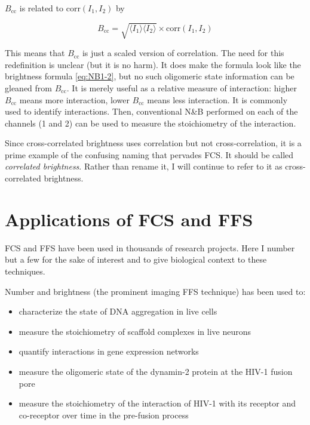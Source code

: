 \documentclass[12pt,]{book}
\providecommand{\tightlist}{%
  \setlength{\itemsep}{0pt}\setlength{\parskip}{0pt}}
\theoremstyle{definition}
\theoremstyle{definition}
\theoremstyle{definition}
\theoremstyle{remark}
\let\BeginKnitrBlock\begin \let\EndKnitrBlock\end
\begin{document}
\(B_\text{cc}\) is related to \(\text{corr}(I_1, I_2)\) by

\begin{equation}
B_\text{cc} = \sqrt{\langle I_1 \rangle \langle I_2 \rangle} \times \text{corr}(I_1, I_2)
\label{eq:bcc-corr}
\end{equation}

This means that \(B_\text{cc}\) is just a scaled version of correlation.
The need for this redefinition is unclear (but it is no harm). It does
make the formula look like the brightness formula \eqref{eq:NB1-2}, but no
such oligomeric state information can be gleaned from \(B_\text{cc}\).
It is merely useful as a relative measure of interaction: higher
\(B_\text{cc}\) means more interaction, lower \(B_\text{cc}\) means less
interaction. It is commonly used to identify interactions. Then,
conventional N\&B performed on each of the channels (1 and 2) can be
used to measure the stoichiometry of the interaction.

\BeginKnitrBlock{remark}
\iffalse{} {Remark. } \fi{}Since cross-correlated brightness uses
correlation but not cross-correlation, it is a prime example of the
confusing naming that pervades FCS. It should be called \emph{correlated
brightness}. Rather than rename it, I will continue to refer to it as
cross-correlated brightness.
\EndKnitrBlock{remark}

\section{Applications of FCS and FFS}\label{applications-of-fcs-and-ffs}

FCS and FFS have been used in thousands of research projects. Here I
number but a few for the sake of interest and to give biological context
to these techniques.

Number and brightness (the prominent imaging FFS technique) has been
used to:

\begin{itemize}
\tightlist
\item
  characterize the state of DNA aggregation in live cells
  \citep{Mieruszynski}
\item
  measure the stoichiometry of scaffold complexes in live neurons
  \citep{Moutin}
\item
  quantify interactions in gene expression networks \citep{Declerck}
\item
  measure the oligomeric state of the dynamin-2 protein at the HIV-1
  fusion pore \citep{DanDynamin}
\item
  measure the stoichiometry of the interaction of HIV-1 with its
  receptor and co-receptor over time in the pre-fusion process
  \citep{HIVstoichiometry}
\end{itemize}
\end{document}
